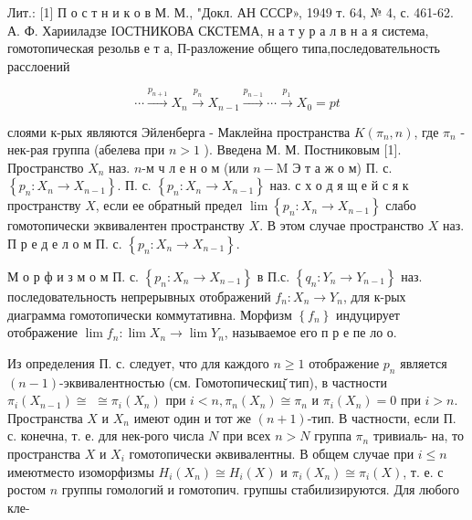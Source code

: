 \documentclass[10pt]{article}
\begin{document}
Лит.: [1] П о с т н и к о в М. М., "Докл. АН СССР», 1949 т. 64, № 4, с. 461-62. А. Ф. Харииладзе IОСТНИКОВА СКСТЕМА, н а т у р а л в н а я система, гомотопическая резольв е т а, П-разложение общего типа,последовательность расслоений



\[

\cdots \stackrel{p_{n+1}}{\longrightarrow} X_{n} \stackrel{p_{n}}{\longrightarrow} X_{n-1} \stackrel{p_{n-1}}{\longrightarrow} \cdots \stackrel{p_{1}}{\longrightarrow} X_{0}=p t

\]



слоями к-рых являются Эйленберга - Маклейна пространства $K\left(\pi_{n}, n\right)$, где $\pi_{n}$ - нек-рая группа (абелева при $n>1$ ). Введена М. М. Постниковым [1]. Пространство $X_{n}$ наз. $n$-м ч л е н о м (или $n-\mathrm{M}$ Э т а ж о м) П. с. $\left\{p_{n}: X_{n} \rightarrow X_{n-1}\right\}$. П. с. $\left\{p_{n}: X_{n} \rightarrow X_{n-1}\right\}$ наз. с х о д я щ е й с я к пространству $X$, если ее обратный предел $\lim \left\{p_{n}: X_{n} \rightarrow X_{n-1}\right\}$ слабо гомотопически эквивалентен пространству $X$. В этом случае пространство $X$ наз. П р е д е л о м П. с. $\left\{p_{n}: X_{n} \rightarrow X_{n-1}\right\}$.



М о р ф и з м о м П. с. $\left\{p_{n}: X_{n} \rightarrow X_{n-1}\right\}$ в П.с. $\left\{q_{n}: Y_{n} \rightarrow Y_{n-1}\right\}$ наз. последовательность непрерывных отображений $f_{n}: X_{n} \rightarrow Y_{n}$, для к-рых диаграмма гомотопически коммутативна. Морфизм $\left\{f_{n}\right\}$ индуцирует отображение $\lim f_{n}: \lim X_{n} \rightarrow \lim Y_{n}$, называемое его п р е пе ло о.



Из определения П. с. следует, что для каждого $n \geqslant 1$ отображение $p_{n}$ является $(n-1)$-эквивалентностью (см. Гомотопическиц̆ тип), в частности $\pi_{i}\left(X_{n-1}\right) \cong$ $\cong \pi_{i}\left(X_{n}\right)$ при $i<n, \pi_{n}\left(X_{n}\right) \cong \pi_{n}$ и $\pi_{i}\left(X_{n}\right)=0$ при $i>n$. Пространства $X$ и $X_{n}$ имеют один и тот же $(n+1)$-тип. В частности, если П. с. конечна, т. е. для нек-рого числа $N$ при всех $n>N$ группа $\pi_{n}$ тривиаль- на, то пространства $X$ и $X_{i}$ гомотопически әквивалентны. В общем случае при $i \leqslant n$ имеютместо изоморфизмы $H_{i}\left(X_{n}\right) \cong H_{i}(X)$ и $\pi_{i}\left(X_{n}\right) \cong \pi_{i}(X)$, т. е. с ростом $n$ группы гомологий и гомотопич. групшы стабилизируются. Для любого кле-
\end{document}
